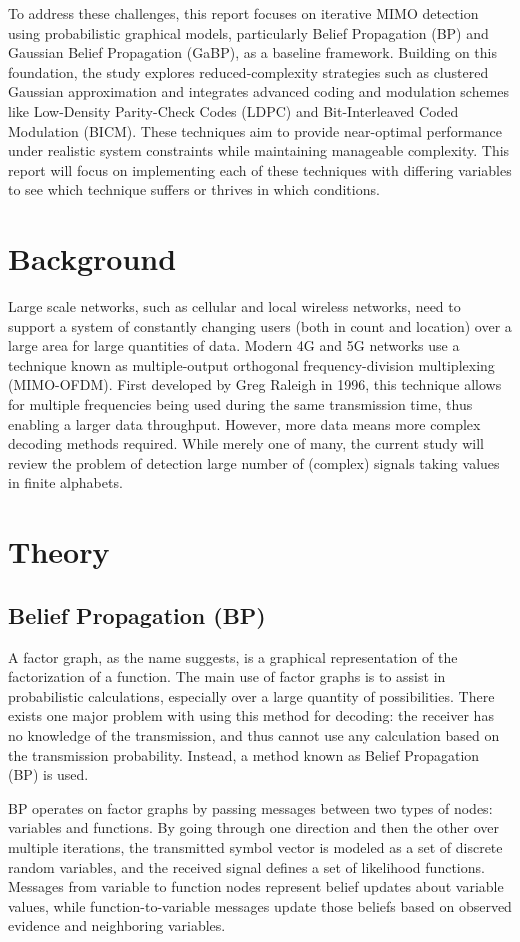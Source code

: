 \documentclass[conference]{IEEEtran}
\begin{document}
To address these challenges, this report focuses on iterative MIMO detection using probabilistic graphical models, particularly Belief Propagation (BP) and Gaussian Belief Propagation (GaBP), as a baseline framework. Building on this foundation, the study explores reduced-complexity strategies such as clustered Gaussian approximation and integrates advanced coding and modulation schemes like Low-Density Parity-Check Codes (LDPC) and Bit-Interleaved Coded Modulation (BICM). These techniques aim to provide near-optimal performance under realistic system constraints while maintaining manageable complexity. This report will focus on implementing each of these techniques with differing variables to see which technique suffers or thrives in which conditions.

\section{Background}
Large scale networks, such as cellular and local wireless networks, need to support a system of constantly changing users (both in count and location) over a large area for large quantities of data. Modern 4G and 5G networks use a technique known as multiple-output orthogonal frequency-division multiplexing (MIMO-OFDM). First developed by Greg Raleigh in 1996, this technique allows for multiple frequencies being used during the same transmission time, thus enabling a larger data throughput. However, more data means more complex decoding methods required. While merely one of many, the current study will review the problem of detection large number of (complex) signals taking values in finite alphabets.

\section{Theory}
\subsection{Belief Propagation (BP)}
A factor graph, as the name suggests, is a graphical representation of the factorization of a function. The main use of factor graphs is to assist in probabilistic calculations, especially over a large quantity of possibilities. There exists one major problem with using this method for decoding: the receiver has no knowledge of the transmission, and thus cannot use any calculation based on the transmission probability. Instead, a method known as Belief Propagation (BP) is used.\par
BP operates on factor graphs by passing messages between two types of nodes: variables and functions. By going through one direction and then the other over multiple iterations, the transmitted symbol vector is modeled as a set of discrete random variables, and the received signal defines a set of likelihood functions. Messages from variable to function nodes represent belief updates about variable values, while function-to-variable messages update those beliefs based on observed evidence and neighboring variables.
\end{document}
